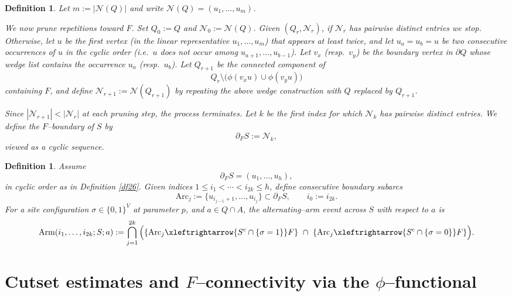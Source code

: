 \documentclass[11pt]{amsart}
\theoremstyle{plain}
\newtheorem{definition}[theorem]{Definition}
\numberwithin{equation}{section}
\numberwithin{figure}{section}
\begin{document}
\begin{definition}
Let \(m:=|\mathcal N(Q)|\) and write \(\mathcal N(Q)=(u_1,\dots,u_m)\).

\smallskip
We now prune repetitions toward $F$.
Set $Q_0:=Q$ and $\mathcal N_0:=\mathcal N(Q)$.
Given $(Q_r,\mathcal N_r)$, if $\mathcal N_r$ has pairwise distinct entries we stop.
Otherwise, let $u$ be the first vertex (in the linear representative $u_1,\dots,u_m$)
that appears at least twice, and let $u_a=u_b=u$ be two \emph{consecutive occurrences}
of $u$ in the cyclic order (i.e.\ $u$ does not occur among $u_{a+1},\dots,u_{b-1}$).
Let $v_x$ (resp.\ $v_y$) be the boundary vertex in $\partial Q$ whose wedge list
contains the occurrence $u_a$ (resp.\ $u_b$).
Let $Q_{r+1}$ be the connected component of
\[
Q_r\setminus\bigl(\phi(v_xu)\cup \phi(v_yu)\bigr)
\]
containing $F$, and define $\mathcal N_{r+1}:=\mathcal N(Q_{r+1})$
by repeating the above wedge construction with $Q$ replaced by $Q_{r+1}$.

Since $|\mathcal N_{r+1}|<|\mathcal N_r|$ at each pruning step, the process terminates.
Let $k$ be the first index for which $\mathcal N_k$ has pairwise distinct entries.
We define the \emph{$F$--boundary of $S$} by
\[
\partial_F S := \mathcal N_k,
\]
viewed as a cyclic sequence.
\end{definition}



\begin{definition}\label{df443}
Assume
\[
\partial_F S=(u_1,\dots,u_h),
\]
in cyclic order as in Definition \ref{df26}.
Given indices \(1\le i_1<\cdots<i_{2k}\le h\), define consecutive boundary subarcs
\[
\mathrm{Arc}_j:=\{u_{i_{j-1}+1},\dots,u_{i_j}\}\subset\partial_{F}S,\qquad i_0:=i_{2k}.
\]
For a site configuration \(\sigma\in\{0,1\}^V\) at parameter \(p\), and $a\in Q\cap A$, the \emph{alternating–arm event}
across \(S\) with respect to $a$ is
\begin{equation}\label{eq:def-Arm}
\mathrm{Arm}(i_1,\dots,i_{2k};S;a)
:= \bigcap_{j=1}^{2k}\Big(
  \{\mathrm{Arc}_j \xleftrightarrow{S^{\mathrm c}\cap\{\sigma=1\}} F\}
  \ \cap\
  \{\mathrm{Arc}_j \xleftrightarrow{S^{\mathrm c}\cap\{\sigma=0\}} F\}
\Big).
\end{equation}
\end{definition}








\section{Cutset estimates and $F$--connectivity via the $\phi$--functional}
\label{sec5}
\end{document}
